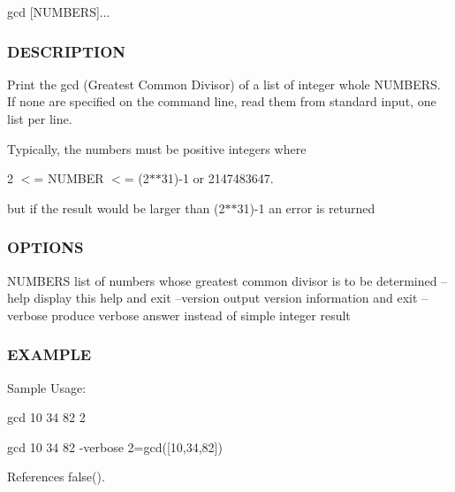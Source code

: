 \begin{DoxyVerb}    gcd [NUMBERS]...
\end{DoxyVerb}


\subsubsection*{D\+E\+S\+C\+R\+I\+P\+T\+I\+ON}

Print the gcd (Greatest Common Divisor) of a list of integer whole N\+U\+M\+B\+E\+RS. If none are specified on the command line, read them from standard input, one list per line.

Typically, the numbers must be positive integers where

2 $<$= N\+U\+M\+B\+ER $<$= (2$\ast$$\ast$31)-\/1 or 2147483647.

but if the result would be larger than (2$\ast$$\ast$31)-\/1 an error is returned

\subsubsection*{O\+P\+T\+I\+O\+NS}

N\+U\+M\+B\+E\+RS list of numbers whose greatest common divisor is to be determined --help display this help and exit --version output version information and exit --verbose produce verbose answer instead of simple integer result \subsubsection*{E\+X\+A\+M\+P\+LE}

Sample Usage\+:

gcd 10 34 82 2

gcd 10 34 82 -\/verbose 2=gcd(\mbox{[}10,34,82\mbox{]}) 

References false().

